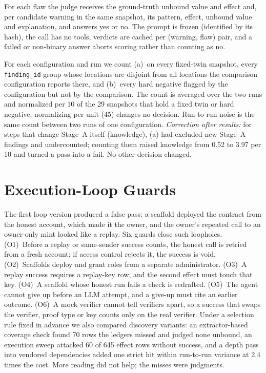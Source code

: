 For each flaw the judge receives the ground-truth unbound value and effect
and, per candidate warning in the same snapshot, its pattern, effect,
unbound value and explanation, and answers yes or no. The prompt is frozen
(identified by its hash), the call has no tools, verdicts are cached per
(warning, flaw) pair, and a failed or non-binary answer aborts scoring rather
than counting as no.

For each configuration and run we count (a)~on every fixed-twin snapshot,
every \texttt{finding\_id} group whose locations are disjoint from all
locations the comparison configuration reports there, and (b)~every hard
negative flagged by the configuration but not by the comparison. The count is
averaged over the two runs and normalized per 10 of the 29 snapshots that
hold a fixed twin or hard negative; normalizing per unit (45) changes no
decision. Run-to-run noise is the same count between two runs of one
configuration. \emph{Correction after results:} for steps that change
Stage~A itself (knowledge), (a) had excluded new Stage~A findings and
undercounted; counting them raised knowledge from 0.52 to 3.97 per 10 and
turned a pass into a fail. No other decision changed.

\section{Execution-Loop Guards}\label{app:guards}
The first loop version produced a false pass: a scaffold deployed the
contract from the honest account, which made it the owner, and the owner's
repeated call to an owner-only mint looked like a replay. Six guards close
such loopholes. (O1)~Before a replay or same-sender success counts, the
honest call is retried from a fresh account; if access control rejects it,
the success is void. (O2)~Scaffolds deploy and grant roles from a separate
administrator. (O3)~A replay success requires a replay-key row, and the
second effect must touch that key. (O4)~A scaffold whose honest run fails a
check is redrafted. (O5)~The agent cannot give up before an LLM attempt, and
a give-up must cite an earlier outcome. (O6)~A mock verifier cannot tell
verifiers apart, so a success that swaps the verifier, proof type or key
counts only on the real verifier. Under a selection rule fixed in advance we
also compared discovery variants: an extractor-based coverage check found 70
rows the ledgers missed and judged none unbound, an execution sweep attacked
60 of 645 effect rows without success, and a depth pass into vendored
dependencies added one strict hit within run-to-run variance at 2.4 times the
cost. More reading did not help; the misses were judgments.

